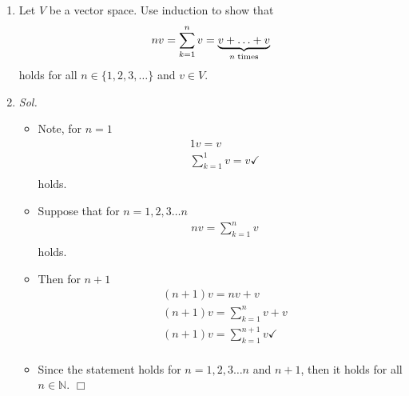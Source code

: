\documentclass[11pt]{article}
\newcommand{\tn}{\textnormal}
\begin{document}
\begin{enumerate}
\begin{itemize}
    \end{itemize}
    \clearpage
	\item Let $V$ be a vector space. Use induction to show that
  \begin{equation*}
		n v = \sum_{k=1}^n v = \underbrace{v + \ldots + v}_{n \; \tn{times}}
	\end{equation*}
	holds for all $n \in \{1,2,3,\ldots\}$ and $v \in V$.

  \item[] \textit{ Sol. }
    \begin{itemize}
      \item[] Note, for $n = 1$ \begin{align*}
          & 1 v = v \\
          & \sum_{k=1}^{1} v = v \checkmark \\
        \end{align*}
        holds. 
      \item[] Suppose that for $n = 1, 2, 3 \ldots n$ \begin{align*}
          & n v = \sum_{k=1}^{n} v \\
        \end{align*}
        holds. 
      \item[] Then for $n+1$ \begin{align*}
          & (n+1)v = nv + v \\
          & (n+1)v = \sum_{k=1}^{n} v + v \\
          & (n+1)v = \sum_{k=1}^{n+1} v \checkmark \\
        \end{align*}
      \item[] Since the statement holds for $n = 1, 2, 3 \ldots n$ and $n+1$,
        then it holds for all $n \in \mathbb{N}$. $\Box$
    \end{itemize}
		

\end{enumerate}
\end{document}
